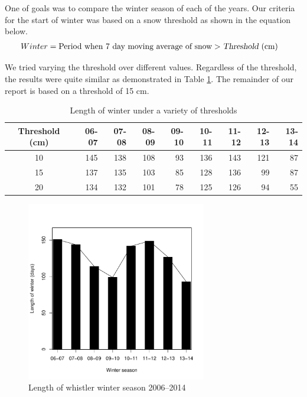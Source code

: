 \documentclass[12pt,twoside]{article}
\begin{document}
{One of goals was to compare the winter season of each of the years. Our criteria for the start of winter was based on a snow threshold as shown in the equation below.
%
\begin{align*}
Winter &= \text{Period when } \text{7 day moving average of} \text{ snow} > \textsl{Threshold} \text{ (cm)}
\end{align*}

\medskip\noindent We tried varying the threshold over different values. Regardless of the threshold, the results were quite similar as demonstrated in Table \ref{tab:robustcheck}. The remainder of our report is based on a threshold of 15 cm.

\begin{table}[ht]
\centering
\begin{tabular}{c|rrrrrrrr}
  \hline
Threshold (cm) & 06-07 & 07-08 & 08-09 & 09-10 & 10-11 & 11-12 & 12-13 & 13-14 \\ 
  \hline
10 & 145 & 138 & 108 & 93 & 136 & 143 & 121 & 87 \\ 
  15 & 137 & 135 & 103 & 85 & 128 & 136 & 99 & 87 \\ 
  20 & 134 & 132 & 101 & 78 & 125 & 126 & 94 & 55 \\ 
   \hline
\end{tabular}
\caption{Length of winter under a variety of thresholds} 
\label{tab:robustcheck}
\end{table}


\begin{figure}[!ht]
\begin{center}
\includegraphics[width=0.7\textwidth]{report-lengthwinter}
\end{center}
\caption{Length of whistler winter season 2006--2014}
\label{fig:lengthwinter}
\end{figure}

}
\end{document}
